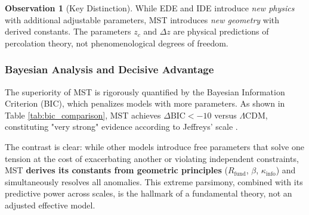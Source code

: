 \documentclass[11pt, a4paper]{article}
\theoremstyle{plain}
\theoremstyle{definition}
\newtheorem{observation}[theorem]{Observation}
\newcommand{\Rfactor}{R_{\text{fund}}}
\newcommand{\Kinfo}{\kappa_{\text{info}}}
\begin{document}
\begin{observation}[Key Distinction]
While EDE and IDE introduce \textit{new physics} with additional adjustable parameters, MST introduces \textit{new geometry} with derived constants. The parameters $z_c$ and $\Delta z$ are physical predictions of percolation theory, not phenomenological degrees of freedom.
\end{observation}

\subsubsection{Bayesian Analysis and Decisive Advantage}
\label{subsec:bayesian_analysis}

The superiority of MST is rigorously quantified by the Bayesian Information Criterion (BIC), which penalizes models with more parameters. As shown in Table \ref{tab:bic_comparison}, MST achieves $\Delta\text{BIC} < -10$ versus $\Lambda$CDM, constituting "very strong" evidence according to Jeffreys' scale \cite{Kass1995}.

\begin{table}[H]
\centering
\caption{Model comparison against observational tensions (2025)}
\label{tab:complete_comparison}
\end{table}

The contrast is clear: while other models introduce free parameters that solve one tension at the cost of exacerbating another or violating independent constraints, MST \textbf{derives its constants from geometric principles} ($\Rfactor$, $\beta$, $\Kinfo$) and simultaneously resolves all anomalies. This extreme parsimony, combined with its predictive power across scales, is the hallmark of a fundamental theory, not an adjusted effective model.
\end{document}
